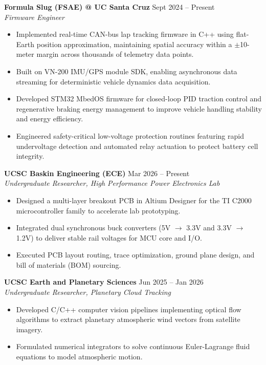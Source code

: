 \documentclass[letterpaper,10pt]{article}
\begin{document}
\textbf{Formula Slug (FSAE) @ UC Santa Cruz} \hfill Sept 2024 -- Present \\
\textit{Firmware Engineer}
\begin{itemize}
    \item Implemented real-time CAN-bus lap tracking firmware in C++ using flat-Earth position approximation, maintaining spatial accuracy within a $\pm$10-meter margin across thousands of telemetry data points.
    \item Built on VN-200 IMU/GPS module SDK, enabling asynchronous data streaming for deterministic vehicle dynamics data acquisition.
    \item Developed STM32 MbedOS firmware for closed-loop PID traction control and regenerative braking energy management to improve vehicle handling stability and energy efficiency.
    \item Engineered safety-critical low-voltage protection routines featuring rapid undervoltage detection and automated relay actuation to protect battery cell integrity.
\end{itemize}

\textbf{UCSC Baskin Engineering (ECE)} \hfill Mar 2026 -- Present \\
\textit{Undergraduate Researcher, High Performance Power Electronics Lab}
\begin{itemize}
    \item Designed a multi-layer breakout PCB in Altium Designer for the TI C2000 microcontroller family to accelerate lab prototyping.
    \item Integrated dual synchronous buck converters (5V $\rightarrow$ 3.3V and 3.3V $\rightarrow$ 1.2V) to deliver stable rail voltages for MCU core and I/O.
    \item Executed PCB layout routing, trace optimization, ground plane design, and bill of materials (BOM) sourcing.
\end{itemize}

\textbf{UCSC Earth and Planetary Sciences} \hfill Jun 2025 -- Jan 2026 \\
\textit{Undergraduate Researcher, Planetary Cloud Tracking}
\begin{itemize}
    \item Developed C/C++ computer vision pipelines implementing optical flow algorithms to extract planetary atmospheric wind vectors from satellite imagery.
    \item Formulated numerical integrators to solve continuous Euler-Lagrange fluid equations to model atmospheric motion.
\end{itemize}
\end{document}
